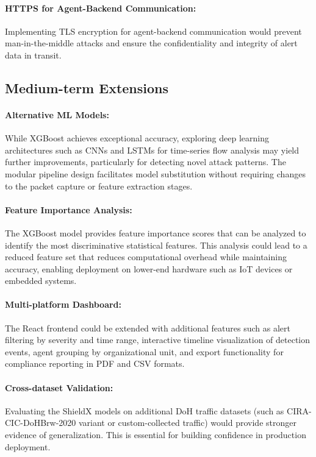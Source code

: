 \documentclass[../Main.tex]{subfiles}
\begin{document}
\paragraph{HTTPS for Agent-Backend Communication:} Implementing TLS encryption for agent-backend communication would prevent man-in-the-middle attacks and ensure the confidentiality and integrity of alert data in transit.

\subsection{Medium-term Extensions}

\paragraph{Alternative ML Models:} While XGBoost achieves exceptional accuracy, exploring deep learning architectures such as CNNs and LSTMs for time-series flow analysis may yield further improvements, particularly for detecting novel attack patterns. The modular pipeline design facilitates model substitution without requiring changes to the packet capture or feature extraction stages.

\paragraph{Feature Importance Analysis:} The XGBoost model provides feature importance scores that can be analyzed to identify the most discriminative statistical features. This analysis could lead to a reduced feature set that reduces computational overhead while maintaining accuracy, enabling deployment on lower-end hardware such as IoT devices or embedded systems.

\paragraph{Multi-platform Dashboard:} The React frontend could be extended with additional features such as alert filtering by severity and time range, interactive timeline visualization of detection events, agent grouping by organizational unit, and export functionality for compliance reporting in PDF and CSV formats.

\paragraph{Cross-dataset Validation:} Evaluating the ShieldX models on additional DoH traffic datasets (such as CIRA-CIC-DoHBrw-2020 variant or custom-collected traffic) would provide stronger evidence of generalization. This is essential for building confidence in production deployment.
\end{document}
